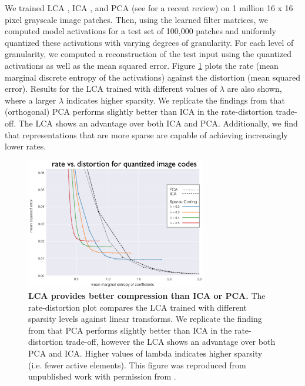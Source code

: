 We trained LCA \parencite{rozell2008sparse}, ICA \parencite{bell1997independent}, and PCA (see \cite{jolliffe2016principal} for a recent review) on 1 million 16 x 16 pixel grayscale image patches. Then, using the learned filter matrices, we computed model activations for a test set of 100,000 patches and uniformly quantized these activations with varying degrees of granularity. For each level of granularity, we computed a reconstruction of the test input using the quantized activations as well as the mean squared error. Figure \ref{fig:ch4_rate_distortion} plots the rate (mean marginal discrete entropy of the activations) against the distortion (mean squared error). Results for the LCA trained with different values of $\lambda$ are also shown, where a larger $\lambda$ indicates higher sparsity. We replicate the findings from \parencite{eichhorn2009natural} that (orthogonal) PCA  performs slightly better than ICA in the rate-distortion trade-off. The LCA shows an advantage over both ICA and PCA. Additionally, we find that representations that are more sparse are capable of achieving increasingly lower rates.

\begin{figure}[h]
    \centering
    \includegraphics[width=0.7\textwidth]{figures/rate_distortion.png}
    \caption{\textbf{LCA provides better compression than ICA or PCA.} The rate-distortion plot compares the LCA trained with different sparsity levels against linear transforms. We replicate the finding from \parencite{eichhorn2009natural} that PCA performs slightly better than ICA in the rate-distortion trade-off, however the LCA shows an advantage over both PCA and ICA. Higher values of lambda indicates higher sparsity (i.e. fewer active elements). This figure was reproduced from unpublished work with permission from \parencite{sanborn2016sampling}.}
    \label{fig:ch4_rate_distortion}
\end{figure}


